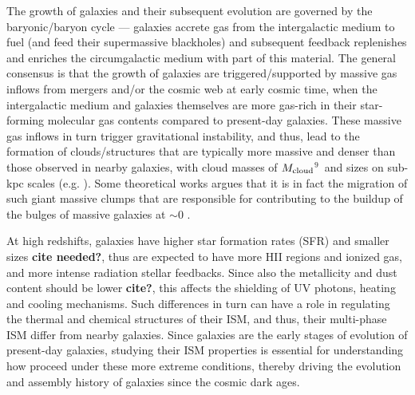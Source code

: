 \documentclass[apj]{emulateapj} %
\begin{document}
The growth of galaxies and their subsequent evolution are governed by the baryonic/baryon cycle ---
galaxies accrete gas from the intergalactic medium to fuel \SF (and feed their supermassive blackholes)
and subsequent feedback replenishes and enriches the circumgalactic medium with part of this material.
The general consensus is that the growth of \highz galaxies are triggered/supported by massive
gas inflows from mergers and/or the cosmic web at early cosmic time, when the intergalactic 
medium and galaxies themselves are more gas-rich in their star-forming molecular 
gas contents compared to present-day galaxies.
These massive gas inflows in turn trigger gravitational instability, and thus, lead
to the formation of clouds/structures that are typically more massive and denser than those 
observed in nearby galaxies, with cloud masses of $M_{\rm cloud}$$^9$\,\Msun 
and sizes on sub-kpc scales (e.g. \citealt{Gabor13a, Hopkins14a, Inoue16a}).
Some theoretical works argues that it is in fact the
migration of such giant massive clumps that are responsible for contributing to the 
buildup of the bulges of massive galaxies at \z$\sim$0 \citep[e.g.,][]{Ceverino10a}.

At high redshifts, galaxies have higher star formation rates (SFR) and smaller sizes {\bf cite needed?}, thus are expected to have more {\sc HII} regions and ionized gas, and more intense radiation stellar feedbacks. Since also the metallicity and dust content should be lower {\bf cite?}, this affects the shielding of UV photons, heating and cooling mechanisms. Such differences in turn can have a role in regulating the thermal and chemical structures of their ISM, and thus, their multi-phase ISM differ from nearby galaxies.
%
Since \highz galaxies are the early stages of evolution of present-day galaxies, studying their ISM properties is essential for understanding how \SF proceed under these more extreme conditions, thereby driving the evolution and assembly history of galaxies since the cosmic dark ages.
\end{document}

